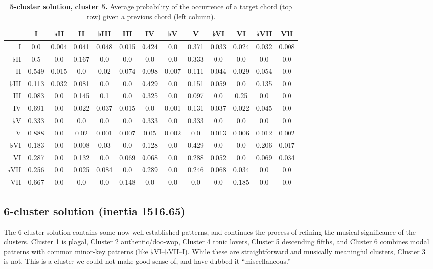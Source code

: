 \begin{table}[htbp]
\begin{minipage}{\linewidth}
\setlength{\tymax}{0.5\linewidth}
\centering
\small
\caption{\textbf{5-cluster solution, cluster 5.} Average probability of the occurrence of a target chord (top row) given a previous chord (left column).}
\label{5-clustersolutioncluster5.averageprobabilityoftheoccurrenceofatargetchordtoprowgivenapreviouschordleftcolumn.}
\begin{tabulary}{\textwidth}{@{}RCCCCCCCCCCCC@{}} \toprule
&I&♭II&II&♭III&III&IV&♭V&V&♭VI&VI&♭VII&VII\\
\midrule
I&0.0&0.004&0.041&0.048&0.015&0.424&0.0&0.371&0.033&0.024&0.032&0.008\\
♭II&0.5&0.0&0.167&0.0&0.0&0.0&0.0&0.333&0.0&0.0&0.0&0.0\\
II&0.549&0.015&0.0&0.02&0.074&0.098&0.007&0.111&0.044&0.029&0.054&0.0\\
♭III&0.113&0.032&0.081&0.0&0.0&0.429&0.0&0.151&0.059&0.0&0.135&0.0\\
III&0.083&0.0&0.145&0.1&0.0&0.325&0.0&0.097&0.0&0.25&0.0&0.0\\
IV&0.691&0.0&0.022&0.037&0.015&0.0&0.001&0.131&0.037&0.022&0.045&0.0\\
♭V&0.333&0.0&0.0&0.0&0.0&0.333&0.0&0.333&0.0&0.0&0.0&0.0\\
V&0.888&0.0&0.02&0.001&0.007&0.05&0.002&0.0&0.013&0.006&0.012&0.002\\
♭VI&0.183&0.0&0.008&0.03&0.0&0.128&0.0&0.429&0.0&0.0&0.206&0.017\\
VI&0.287&0.0&0.132&0.0&0.069&0.068&0.0&0.288&0.052&0.0&0.069&0.034\\
♭VII&0.256&0.0&0.025&0.084&0.0&0.289&0.0&0.246&0.068&0.034&0.0&0.0\\
VII&0.667&0.0&0.0&0.0&0.148&0.0&0.0&0.0&0.0&0.185&0.0&0.0\\

\bottomrule

\end{tabulary}
\end{minipage}
\end{table}

\subsection{6-cluster solution (inertia 1516.65)}
\label{6-clustersolutioninertia1516.65}

The 6-cluster solution contains some now well established patterns, and continues the process of refining the musical significance of the clusters. Cluster 1 is plagal, Cluster 2 authentic\slash doo-wop, Cluster 4 tonic lovers, Cluster 5 descending fifths, and Cluster 6 combines modal patterns with common minor-key patterns (like ♭VI–♭VII–I). While these are straightforward and musically meaningful clusters, Cluster 3 is not. This is a cluster we could not make good sense of, and have dubbed it ``miscellaneous.''

